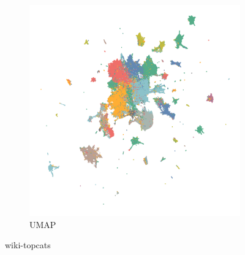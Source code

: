 \begin{appendix}
\begin{figure}[tbp]
\begin{subfigure}{0.45\linewidth}
    \includegraphics[width=\linewidth]{img/emb/umap_wiki-topcats}
    \caption{UMAP}
  \end{subfigure}
  \caption{wiki-topcats}
\end{figure}

\end{appendix}
